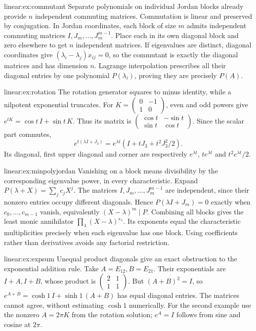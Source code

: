 \begin{solution}{linear:ex:commutant}
\idea Separate polynomials on individual Jordan blocks already provide $n$ independent commuting matrices.
\writeup Commutation is linear and preserved by conjugation. In Jordan coordinates, each block of size $m$ admits independent commuting matrices $I,J_m,\ldots,J_m^{m-1}$. Place each in its own diagonal block and zero elsewhere to get $n$ independent matrices. If eigenvalues are distinct, diagonal coordinates give $(\lambda_i-\lambda_j)x_{ij}=0$, so the commutant is exactly the diagonal matrices and has dimension $n$. Lagrange interpolation prescribes all their diagonal entries by one polynomial $P(\lambda_i)$, proving they are precisely $P(A)$.
\end{solution}
\begin{solution}{linear:ex:rotation}
\idea The rotation generator squares to minus identity, while a nilpotent exponential truncates.
\writeup For $K=\begin{pmatrix}0&-1\\1&0\end{pmatrix}$, even and odd powers give $e^{tK}=\cos t\,I+\sin t\,K$. Thus its matrix is $\begin{pmatrix}\cos t&-\sin t\\\sin t&\cos t\end{pmatrix}$. Since the scalar part commutes,
\[e^{t(\lambda I+J_3)}=e^{\lambda t}(I+tJ_3+t^2J_3^2/2).
\]
Its diagonal, first upper diagonal and corner are respectively $e^{\lambda t}$, $te^{\lambda t}$ and $t^2e^{\lambda t}/2$.
\end{solution}
\begin{solution}{linear:ex:minpolyjordan}
\idea Vanishing on a block means divisibility by the corresponding eigenvalue power, in every characteristic.
\writeup Expand $P(\lambda+X)=\sum_jc_jX^j$. The matrices $I,J_m,\ldots,J_m^{m-1}$ are independent, since their nonzero entries occupy different diagonals. Hence $P(\lambda I+J_m)=0$ exactly when $c_0,\ldots,c_{m-1}$ vanish, equivalently $(X-\lambda)^m\mid P$. Combining all blocks gives the least monic annihilator $\prod_\lambda(X-\lambda)^{s_\lambda}$. Its exponents equal the characteristic multiplicities precisely when each eigenvalue has one block. Using coefficients rather than derivatives avoids any factorial restriction.
\end{solution}
\begin{solution}{linear:ex:expsum}
\idea Unequal product diagonals give an exact obstruction to the exponential addition rule.
\writeup Take $A=E_{12},B=E_{21}$. Their exponentials are $I+A,I+B$, whose product is $\begin{pmatrix}2&1\\1&1\end{pmatrix}$. But $(A+B)^2=I$, so $e^{A+B}=\cosh1\,I+\sinh1\,(A+B)$ has equal diagonal entries. The matrices cannot agree, without estimating $\cosh1$ numerically. For the second example use the nonzero $A=2\pi K$ from the rotation solution; $e^A=I$ follows from sine and cosine at $2\pi$.
\end{solution}
